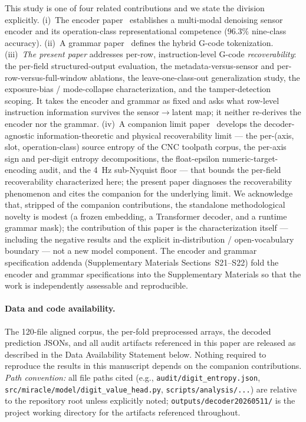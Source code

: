 \documentclass[sensors,article,submit,moreauthors,pdftex]{Definitions/mdpi}
\begin{document}
This study is one of four related contributions and we state the division explicitly. (i)~The encoder paper~\cite{encoder_paper} establishes a multi-modal denoising sensor encoder and its operation-class representational competence ($96.3\%$ nine-class accuracy). (ii)~A grammar paper~\cite{grammar_paper} defines the hybrid G-code tokenization. (iii)~\emph{The present paper} addresses per-row, instruction-level G-code \emph{recoverability}: the per-field structured-output evaluation, the metadata-versus-sensor and per-row-versus-full-window ablations, the leave-one-class-out generalization study, the exposure-bias / mode-collapse characterization, and the tamper-detection scoping. It takes the encoder and grammar as fixed and asks what row-level instruction information survives the sensor$\rightarrow$latent map; it neither re-derives the encoder nor the grammar. (iv)~A companion limit paper~\cite{paperB_entropy} develops the decoder-agnostic information-theoretic and physical recoverability limit --- the per-(axis, slot, operation-class) source entropy of the CNC toolpath corpus, the per-axis sign and per-digit entropy decompositions, the float-epsilon numeric-target-encoding audit, and the 4~Hz sub-Nyquist floor --- that bounds the per-field recoverability characterized here; the present paper diagnoses the recoverability phenomenon and cites the companion for the underlying limit. We acknowledge that, stripped of the companion contributions, the standalone methodological novelty is modest (a frozen embedding, a Transformer decoder, and a runtime grammar mask); the contribution of this paper is the characterization itself --- including the negative results and the explicit in-distribution / open-vocabulary boundary --- not a new model component. The encoder and grammar specification addenda (Supplementary Materials Sections~S21--S22) fold the encoder and grammar specifications into the Supplementary Materials so that the work is independently assessable and reproducible.

\paragraph{Data and code availability.} The 120-file aligned corpus, the per-fold preprocessed arrays, the decoded prediction JSONs, and all audit artifacts referenced in this paper are released as described in the Data Availability Statement below. Nothing required to reproduce the results in this manuscript depends on the companion contributions. \emph{Path convention:} all file paths cited (e.g., \texttt{audit/digit\_entropy.json}, \texttt{src/miracle/model/digit\_value\_head.py}, \texttt{scripts/analysis/...}) are relative to the repository root unless explicitly noted; \texttt{outputs/decoder20260511/} is the project working directory for the artifacts referenced throughout.
\end{document}
